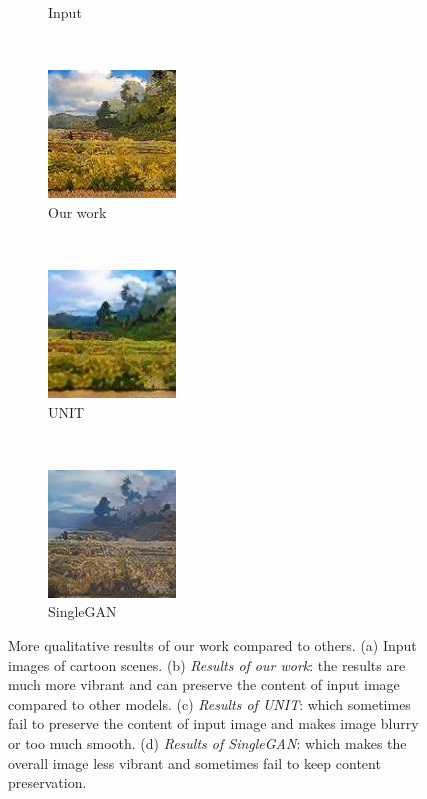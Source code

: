 \documentclass[conference]{IEEEtran}
\begin{document}
\begin{figure}[!htb]
\begin{center}
\begin{subfigure}[normal]{0.2\textwidth}
         \caption{Input}
     \end{subfigure}
     ~
     \begin{subfigure}[normal]{0.2\textwidth}
         \includegraphics[scale = 0.7]{pic/our_3.png}
         \caption{Our work}
     \end{subfigure}
     ~
     \begin{subfigure}[normal]{0.2\textwidth}
         \includegraphics[scale = 0.7]{pic/unit_3.jpg}
         \caption{UNIT}
     \end{subfigure}
     ~
     \begin{subfigure}[normal]{0.2\textwidth}
         \includegraphics[scale = 0.7]{pic/sgan_3.jpg}
         \caption{SingleGAN}
     \end{subfigure}
     \caption{More qualitative results of our work compared to others. (a) Input images of cartoon scenes. (b) \textit{Results of our work}: the results are much more vibrant and can preserve the content of input image compared to other models. (c) \textit{Results of UNIT}\cite{DBLP:journals/corr/LiuBK17}: which sometimes fail to preserve the content of input image and makes image blurry or too much smooth. (d) \textit{Results of SingleGAN}\cite{DBLP:journals/corr/abs-1810-04991}: which makes the overall image less vibrant and sometimes fail to keep content preservation.}
     \label{fig:more results}
\end{center}
\end{figure}
\end{document}
